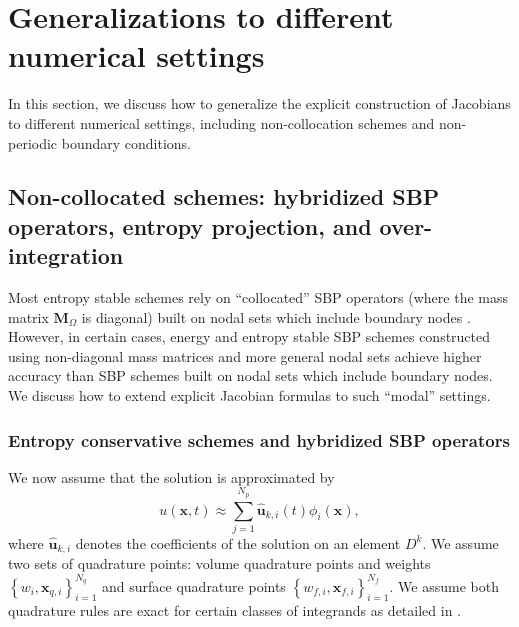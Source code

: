 \documentclass{article}
\renewcommand{\hat}{\widehat}
\newcommand{\LRc}[1]{\left\{ #1 \right\}}
\begin{document}
\section{Generalizations to different numerical settings}

In this section, we discuss how to generalize the explicit construction of Jacobians to different numerical settings, including non-collocation schemes and non-periodic boundary conditions.  

\subsection{Non-collocated schemes: hybridized SBP operators, entropy projection, and over-integration}

Most entropy stable schemes rely on ``collocated'' SBP operators (where the mass matrix $\bm{M}_{\Omega}$ is diagonal) built on nodal sets which include boundary nodes \cite{chen2017entropy, crean2018entropy}.  However, in certain cases, energy and entropy stable SBP schemes constructed using non-diagonal mass matrices \cite{chan2017discretely, chan2019entropy} and more general nodal sets \cite{fernandez2014review, ranocha2018generalised, crean2017high, chan2018efficient} achieve higher accuracy than SBP schemes built on nodal sets which include boundary nodes.  We discuss how to extend explicit Jacobian formulas to such ``modal'' settings.  

\subsubsection{Entropy conservative schemes and hybridized SBP operators}

We now assume that the solution is approximated by 
\[
u(\bm{x},t) \approx \sum_{j=1}^{N_p} \hat{\bm{u}}_{k,i}(t) \phi_i(\bm{x}),
\]
where $\hat{\bm{u}}_{k,i}$ denotes the coefficients of the solution on an element $D^k$.  We assume two sets of quadrature points: volume quadrature points and weights $\LRc{w_i, \bm{x}_{q,i}}_{i=1}^{N_q}$ and surface quadrature points $\LRc{w_{f,i}, \bm{x}_{f,i}}_{i=1}^{N_f}$.  We assume both quadrature rules are exact for certain classes of integrands as detailed in \cite{chan2019skew, chan2019entropy}.  
\end{document}
